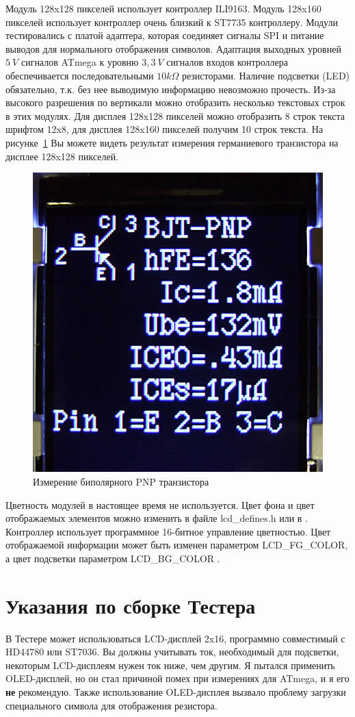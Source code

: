 Модуль 128x128 пикселей использует контроллер ILI9163.
Модуль 128x160 пикселей использует контроллер очень близкий к ST7735 контроллеру.
Модули тестировались с платой адаптера, которая соединяет сигналы SPI и питание выводов для 
нормального отображения символов. Адаптация выходных уровней \(5~V\) сигналов ATmega к уровню \(3,3~V\) 
сигналов входов контроллера обеспечивается последовательными \(10 k\Omega\) резисторами.
Наличие подсветки (LED) обязательно, т.к. без нее выводимую информацию невозможно прочесть.
Из-за высокого разрешения по вертикали можно отобразить несколько текстовых строк в этих модулях.
Для дисплея 128x128 пикселей можно отобразить 8 строк текста шрифтом 12x8,
для дисплея 128x160 пикселей получим 10 строк текста.
На рисунке~\ref{fig:Color_PNP} Вы можете видеть результат измерения германиевого транзистора
на дисплее 128x128 пикселей.

\begin{figure}[H]
\centering
\includegraphics[width=.46\textwidth]{../PNG/Color_PNP_ILI9163.jpg}
\caption{Измерение биполярного PNP транзистора}
\label{fig:Color_PNP}
\end{figure}

Цветность модулей в настоящее время не используется.
Цвет фона и цвет отображаемых элементов можно изменить в файле lcd\_defines.h или
в .
Контроллер использует программное 16-битное управление цветностью. Цвет отображаемой информации может 
быть изменен параметром LCD\_FG\_COLOR, а цвет подсветки параметром LCD\_BG\_COLOR .



\section{Указания по сборке Тестера }

В Тестере может использоваться LCD-дисплей 2x16, программно совместимый с HD44780 или ST7036. Вы должны учитывать ток, 
необходимый для подсветки, некоторым LCD-дисплеям нужен ток ниже, чем другим. Я пытался применить OLED-дисплей, но он 
стал причиной помех при измерениях для ATmega, и я его \textbf{ не} рекомендую. Также использование OLED-дисплея вызвало 
проблему загрузки специального символа для отображения резистора.\\

